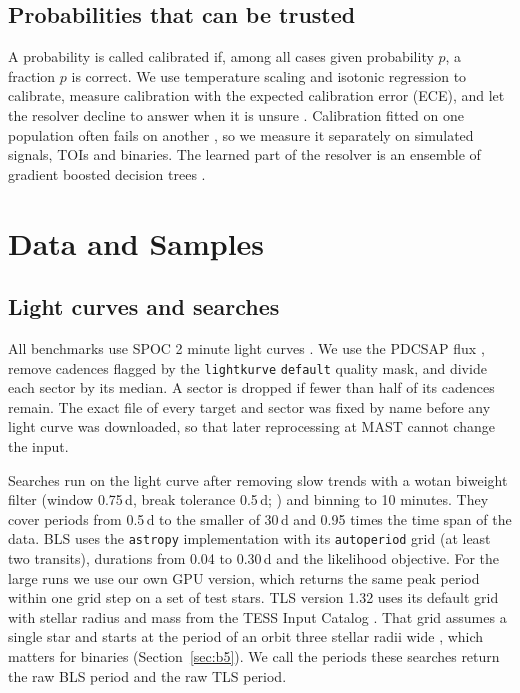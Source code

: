 \documentclass[twocolumn,linenumbers]{aastex701}
\begin{document}
\subsection{Probabilities that can be trusted}

A probability is called calibrated if, among all cases given probability $p$, a fraction $p$ is correct. We use temperature scaling \citep{Guo2017} and isotonic regression \citep{Zadrozny2002,NiculescuMizil2005} to calibrate, measure calibration with the expected calibration error (ECE), and let the resolver decline to answer when it is unsure \citep{Chow1970,Geifman2017}. Calibration fitted on one population often fails on another \citep{Ovadia2019}, so we measure it separately on simulated signals, TOIs and binaries. The learned part of the resolver is an ensemble of gradient boosted decision trees \citep{Friedman2001,Pedregosa2011}.

\section{Data and Samples} \label{sec:data}

\subsection{Light curves and searches} \label{sec:lc}

All benchmarks use SPOC 2 minute light curves \citep{Jenkins2016,TESSdataDOI}. We use the PDCSAP flux \citep{Smith2012,Stumpe2012}, remove cadences flagged by the \texttt{lightkurve} \texttt{default} quality mask, and divide each sector by its median. A sector is dropped if fewer than half of its cadences remain. The exact file of every target and sector was fixed by name before any light curve was downloaded, so that later reprocessing at MAST cannot change the input.

Searches run on the light curve after removing slow trends with a wotan biweight filter (window 0.75\,d, break tolerance 0.5\,d; \citealt{Hippke2019wotan}) and binning to 10 minutes. They cover periods from 0.5\,d to the smaller of 30\,d and 0.95 times the time span of the data. BLS uses the \texttt{astropy} implementation \citep{Astropy2022} with its \texttt{autoperiod} grid (at least two transits), durations from 0.04 to 0.30\,d and the likelihood objective. For the large runs we use our own GPU version, which returns the same peak period within one grid step on a set of test stars. TLS version 1.32 uses its default grid with stellar radius and mass from the TESS Input Catalog \citep[TIC;][]{Stassun2019}. That grid assumes a single star and starts at the period of an orbit three stellar radii wide \citep{Ofir2014}, which matters for binaries (Section~\ref{sec:b5}). We call the periods these searches return the raw BLS period and the raw TLS period.
\end{document}
